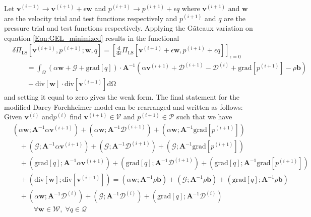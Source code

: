 \documentclass[11pt,reqno]{amsart}
\begin{document}
Let $\mathbf{v}^{(i+1)}\rightarrow\mathbf{v}^{(i+1)} + \epsilon\mathbf{w}$ and $p^{(i+1)}\rightarrow p^{(i+1)} + \epsilon q$ 
where $\mathbf{v}^{(i+1)}$ and $\mathbf{w}$ are the velocity trial and test functions respectively and $p^{(i+1)}$ and $q$ are the pressure trial and test functions respectively. 
Applying the 
G$\hat{\mathrm{a}}$teaux variation on equation \eqref{Eqn:GEL_minimized} results in the functional
\begin{align}
  &\delta\Pi_{\mathrm{LS}}[\mathbf{v}^{(i+1)},p^{(i+1)};\mathbf{w},q] = \left[\frac{\mathrm{d}}{\mathrm{d}\epsilon}\Pi_{\mathrm{LS}}[\mathbf{v}^{(i+1)}+\epsilon\mathbf{w},p^{(i+1)}+
  		\epsilon q]\right]_{\epsilon = 0} \nonumber\\
  	&\qquad = \int_{\Omega}\left(\alpha\mathbf{w} + \mathcal{G} + \mathrm{grad}[q]\right)\cdot\mathbf{A}^{-1}
  \left(\mathrm{\alpha}\mathbf{v}^{(i+1)} + \mathcal{D}^{(i+1)}- \mathcal{D}^{(i)} + \mathrm{grad}[p^{(i+1)}] - \rho \mathbf{b}\right) \nonumber\\
  	&\qquad+ \mathrm{div}[\mathbf{w}]\cdot\mathrm{div}[\mathbf{v}^{(i+1)}] \mathrm{d\Omega}
\end{align}
and setting it equal to zero gives the weak form. 
The final statement for the modified Darcy-Forchheimer 
model can be rearranged and written as follows: Given 
$\mathbf{v}^{(i)}$ and$p^{(i)}$ find $\mathbf{v}^{(i+1)}
\in \mathcal{V}$ and $p^{(i+1)} \in \mathcal{P}$ such 
that we have
\begin{align}
\label{Eqn:weak_least_squares}
  	&\left(\alpha\mathbf{w};\mathbf{A}^{-1}\alpha\mathbf{v}^{(i+1)}\right) + \left(\alpha\mathbf{w};\mathbf{A}^{-1}\mathcal{D}^{(i+1)}\right)
	+ \left(\alpha\mathbf{w};\mathbf{A}^{-1}\mathrm{grad}[p^{(i+1)}]\right) \nonumber \\
	&\quad+\left(\mathcal{G};\mathbf{A}^{-1}\alpha\mathbf{v}^{(i+1)}\right) + \left(\mathcal{G};\mathbf{A}^{-1}\mathcal{D}^{(i+1)}\right)
	+ \left(\mathcal{G};\mathbf{A}^{-1}\mathrm{grad}[p^{(i+1)}]\right) \nonumber \\
	&\quad+\left(\mathrm{grad}[q];\mathbf{A}^{-1}\alpha\mathbf{v}^{(i+1)}\right) + \left(\mathrm{grad}[q];\mathbf{A}^{-1}\mathcal{D}^{(i+1)}\right) + 
	\left(\mathrm{grad}[q];\mathbf{A}^{-1}\mathrm{grad}[p^{(i+1)}]\right) \nonumber \\
	&\quad+ \left(\mathrm{div}[\mathbf{w}];\mathrm{div}[\mathbf{v}^{(i+1)}]\right) = \left(\alpha\mathbf{w};\mathbf{A}^{-1}\rho\mathbf{b}\right) + 
	\left(\mathcal{G};\mathbf{A}^{-1}\rho\mathbf{b}\right) + \left(\mathrm{grad}[q];\mathbf{A}^{-1}\rho\mathbf{b}\right) \nonumber \\
	&\quad+ \left(\alpha\mathbf{w};\mathbf{A}^{-1}\mathcal{D}^{(i)}\right) + \left(\mathcal{G};\mathbf{A}^{-1}\mathcal{D}^{(i)}\right)
	+ \left(\mathrm{grad}[q];\mathbf{A}^{-1}\mathcal{D}^{(i)}\right) \nonumber \\
	&\qquad\quad\forall \mathbf{w} \in \mathcal{W}, \; \forall q \in \mathcal{Q}
\end{align}
\end{document}

